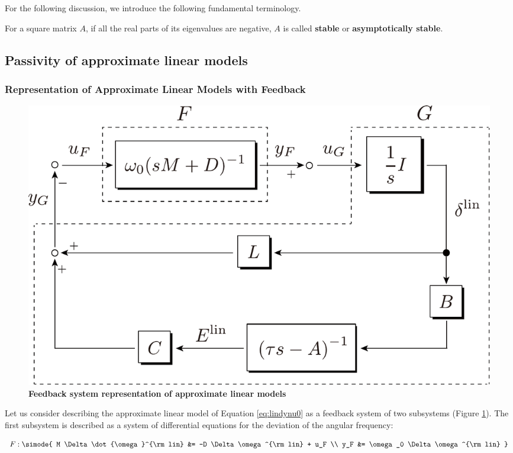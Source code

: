 \documentclass[graybox, envcountchap]{svmult}
\begin{document}
For the following discussion, we introduce the following fundamental
terminology.

\begin{definition}
\label{def:matsta}
For a square matrix $A$, if all the real parts of its eigenvalues are negative,
$A$ is called \textbf{stable} or \textbf{asymptotically
stable}.
\end{definition}

\subsection{Passivity of approximate linear models}\label{sec:linpasana}

\smallskip
\subsubsection{Representation of Approximate Linear Models with Feedback}

\begin{figure}[t]
\centering
\includegraphics[width = .7\linewidth]{figs/FandG}
\medskip
\caption{\textbf{Feedback system representation of approximate linear models}}
\label{fig:GandG}
\medskip
\end{figure}

Let us consider describing the approximate linear model of Equation
\ref{eq:lindynu0} as a feedback system of two subsystems (Figure
\ref{fig:GandG}).  The first subsystem is described as a system of differential
equations for the deviation of the angular frequency:

\begin{equation}\label{eq:Fss}
  F: \simode{
  M \Delta \dot{\omega}^{\rm lin} &= -D \Delta \omega^{\rm lin}
  +
  u_F \\
  y_F &= \omega_0 \Delta \omega^{\rm lin}
  }
\end{equation}
\end{document}
